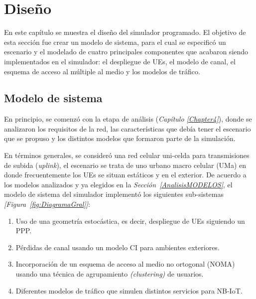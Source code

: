 
\chapter{Diseño} %

\label{Chapter5} %

En este capítulo se muestra el diseño del simulador programado. El objetivo  de esta sección fue crear un modelo de sistema, para el cual se especificó un escenario y el modelado de cuatro principales componentes que acabaron siendo implementados en el simulador: el despliegue de UEs, el modelo de canal, el esquema de acceso al múltiple al medio y los modelos de tráfico.\newline


\section{Modelo de sistema}

En principio, se comenzó con la etapa de análisis (\textit{Capítulo \ref{Chapter4}}), donde se analizaron los requisitos de la red, las características que debía tener el escenario que se propuso y los distintos modelos que formaron parte de la simulación.\newline

En términos generales, se consideró una red celular uni-celda para transmisiones de subida (\textit{uplink}), el escenario se trata de uno urbano macro celular (UMa) en donde frecuentemente los UEs se situan estáticos y en el exterior. De acuerdo a los modelos analizados y ya elegidos en la \textit{Sección~\ref{AnalisisMODELOS}}, el modelo de sistema del simulador  implementó los siguientes sub-sistemas \textit{[Figura~\ref{fig:DiagramaGral}]}:

\begin{enumerate}
    \item  Uso de una geometría estocástica, es decir, despliegue de UEs siguiendo un PPP.
    \item  Pérdidas de canal usando un modelo CI para ambientes exteriores.
    \item  Incorporación de un esquema de acceso al medio no ortogonal (NOMA) usando una técnica de agrupamiento \textit{(clustering)} de usuarios.
    \item  Diferentes modelos de tráfico que simulen distintos servicios para NB-IoT.
\end{enumerate}


